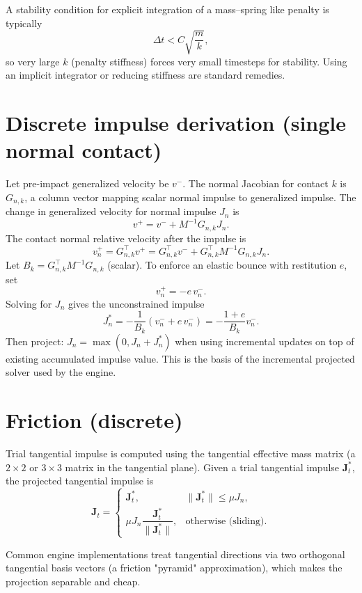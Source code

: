 \documentclass[11pt,a4paper]{article}
\begin{document}
A stability condition for explicit integration of a mass--spring like penalty is typically
\[ \Delta t < C \sqrt{\frac{m}{k}}, \]
so very large $k$ (penalty stiffness) forces very small timesteps for stability. Using an implicit integrator or reducing stiffness are standard remedies.

\section{Discrete impulse derivation (single normal contact)}
Let pre-impact generalized velocity be $v^-$. The normal Jacobian for contact $k$ is $G_{n,k}$, a column vector mapping scalar normal impulse to generalized impulse. The change in generalized velocity for normal impulse $J_n$ is
\[ v^+ = v^- + M^{-1} G_{n,k} J_n. \]
The contact normal relative velocity after the impulse is
\[ v_n^+ = G_{n,k}^\top v^+ = G_{n,k}^\top v^- + G_{n,k}^\top M^{-1} G_{n,k} J_n. \]
Let $B_k = G_{n,k}^\top M^{-1} G_{n,k}$ (scalar). To enforce an elastic bounce with restitution $e$, set
\[ v_n^+ = - e \, v_n^-. \]
Solving for $J_n$ gives the unconstrained impulse
\[ J_n^* = - \frac{1}{B_k} (v_n^- + e\, v_n^- ) = -\frac{1+e}{B_k} v_n^-. \]
Then project: $J_n = \max(0, J_n + J_n^*)$ when using incremental updates on top of existing accumulated impulse value. This is the basis of the incremental projected solver used by the engine.

\section{Friction (discrete)}
Trial tangential impulse is computed using the tangential effective mass matrix (a $2\times2$ or $3\times3$ matrix in the tangential plane). Given a trial tangential impulse $\mathbf{J}_t^*$, the projected tangential impulse is
\[ \mathbf{J}_t = \begin{cases} \mathbf{J}_t^*, & \|\mathbf{J}_t^*\| \le \mu J_n, \\[4pt]
  \mu J_n \dfrac{\mathbf{J}_t^*}{\|\mathbf{J}_t^*\|}, & \text{otherwise (sliding).} \end{cases} \]

Common engine implementations treat tangential directions via two orthogonal tangential basis vectors (a friction "pyramid" approximation), which makes the projection separable and cheap.
\end{document}
